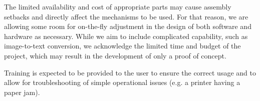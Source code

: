 The limited availability and cost of appropriate parts may cause assembly setbacks and directly affect the mechanisms to be used.
For that reason, we are allowing some room for on-the-fly adjustment in the design of both software and hardware as necessary.
While we aim to include complicated capability, such as image-to-text conversion, we acknowledge the limited time and budget of the project, which may result in the development of only a proof of concept.

Training is expected to be provided to the user to ensure the correct usage and to allow for troubleshooting of simple operational issues (e.g. a printer having a paper jam).